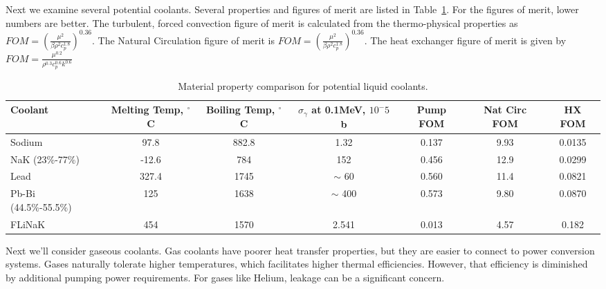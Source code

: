 \documentclass[]{report}
\begin{document}
Next we examine several potential coolants. Several properties and figures of merit are listed in Table~\ref{tab:coolants}. For the figures of merit, lower numbers are better. The turbulent, forced convection figure of merit is calculated from the thermo-physical properties as $FOM=\left(\frac{\mu^2}{\beta\rho^2c_p^{1.8} } \right)^{0.36}$. The Natural Circulation figure of merit is $FOM= \left( \frac{\mu^2}{\beta\rho^2c_p^{1.8}}  \right)^{0.36}$. The heat exchanger figure of merit is given by $FOM= \frac{\mu^{0.2}}{\rho^{0.3}c_p^{0.6}k^{0.6}}$

\begin{table} \label{tab:coolants}
\hspace*{-2cm} %
\begin{tabular}{|l|c|c|c|c|c|c|}
%
%
\centering
Coolant & Melting Temp, $^{\circ}$C & Boiling Temp, $^{\circ}$C & $\sigma_\gamma $ at 0.1MeV, $10^-5$ b & Pump FOM & Nat Circ FOM & HX FOM \\
\hline
Sodium & 97.8 & 882.8 & 1.32 & 0.137 & 9.93 & 0.0135 \\
\hline
NaK (23\%-77\%) & -12.6 & 784 & 152 & 0.456 & 12.9 & 0.0299\\
\hline
Lead & 327.4 & 1745 & $\sim$ 60 & 0.560 & 11.4 & 0.0821\\
\hline
Pb-Bi (44.5\%-55.5\%) & 125 & 1638 & $\sim$ 400 & 0.573 & 9.80 & 0.0870\\
\hline
FLiNaK & 454 & 1570 & 2.541 & 0.013 & 4.57 & 0.182\\
\hline
\end{tabular}
\caption{Material property comparison for potential liquid coolants.}
\end{table}

Next we'll consider gaseous coolants. Gas coolants have poorer heat transfer properties, but they are easier to connect to power conversion systems. Gases naturally tolerate higher temperatures, which facilitates higher thermal efficiencies. However, that efficiency is diminished by additional pumping power requirements.
For gases like Helium, leakage can be a significant concern. 
\end{document}

